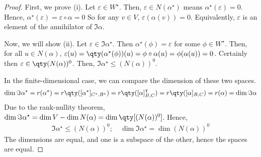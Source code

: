 \begin{proof}
	First, we prove (i).
	Let $\varepsilon \in W^\star$.
	Then, $\varepsilon \in N(\alpha^\star)$ means $\alpha^\star(\varepsilon) = 0$.
	Hence, $\alpha^\star(\varepsilon) = \varepsilon \circ \alpha = 0$
	So for any $v \in V$, $\varepsilon(\alpha(v)) = 0$.
	Equivalently, $\varepsilon$ is an element of the annihilator of $\Im \alpha$.

	Now, we will show (ii).
	Let $\varepsilon \in \Im \alpha^\star$.
	Then $\alpha^\star(\phi) = \varepsilon$ for some $\phi \in W^\star$.
	Then, for all $u \in N(\alpha)$, $\varepsilon(u) = \qty(\alpha^\star(\phi))(u) = \phi \circ \alpha(u) = \phi(\alpha(u)) = 0$.
	Certainly then $\varepsilon \in \qty(N(\alpha))^0$.
	Then, $\Im \alpha^\star \leq (N(\alpha))^0$.

	In the finite-dimensional case, we can compare the dimension of these two spaces.
	\begin{align*}
		\dim \Im \alpha^\star = r(\alpha^\star) = r\qty([\alpha^\star]_{C^\star, B^\star}) = r\qty([\alpha]_{B,C}^\transpose) = r\qty([\alpha]_{B,C}) = r(\alpha) = \dim \Im \alpha
	\end{align*}
	Due to the rank-nullity theorem, $\dim \Im \alpha^\star = \dim V - \dim N(\alpha) = \dim\qty[(N(\alpha))^0]$.
	Hence,
	\begin{align*}
		\Im \alpha^\star \leq (N(\alpha))^0;\quad \dim \Im \alpha^\star = \dim (N(\alpha))^0
	\end{align*}
	The dimensions are equal, and one is a subspace of the other, hence the spaces are equal.
\end{proof}


